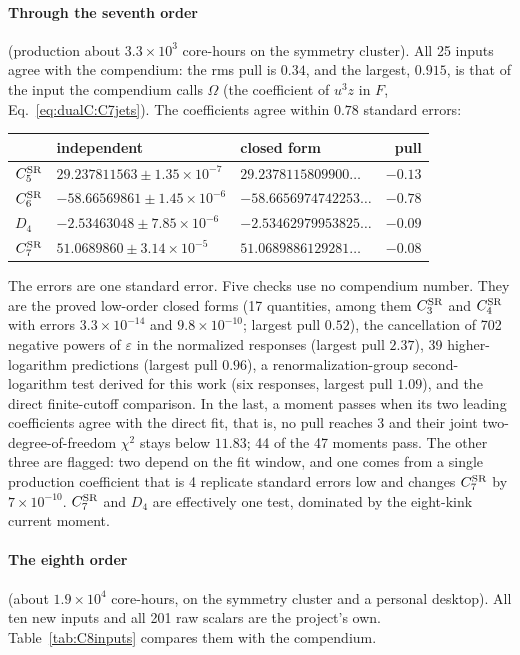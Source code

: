 \documentclass[11pt,a4paper]{article}
\numberwithin{equation}{section}
\newcommand{\CSR}{C^{\rm SR}}
\newcommand{\sci}[2]{#1\times10^{#2}}
\begin{document}
\paragraph{Through the seventh order} (production about $\sci{3.3}{3}$ core-hours on the symmetry cluster). All 25
inputs agree with the compendium: the rms pull is $0.34$, and the largest, $0.915$, is that of the input the compendium
calls $\Omega$ (the coefficient of $u^3z$ in $F$, Eq.~\eqref{eq:dualC:C7jets}). The coefficients agree within $0.78$ standard errors:
\begin{center}\small
\begin{tabular}{@{}lllr@{}}
\toprule
& independent & closed form & pull\\
\midrule
$\CSR_5$ & $29.237811563\pm\sci{1.35}{-7}$ & $29.2378115809900\ldots$ & $-0.13$\\
$\CSR_6$ & $-58.66569861\pm\sci{1.45}{-6}$ & $-58.6656974742253\ldots$ & $-0.78$\\
$D_4$ & $-2.53463048\pm\sci{7.85}{-6}$ & $-2.53462979953825\ldots$ & $-0.09$\\
$\CSR_7$ & $51.0689860\pm\sci{3.14}{-5}$ & $51.0689886129281\ldots$ & $-0.08$\\
\bottomrule
\end{tabular}
\end{center}
The errors are one standard error. Five checks use no compendium number. They are the proved low-order closed forms
(17 quantities, among them $\CSR_3$ and $\CSR_4$ with errors $\sci{3.3}{-14}$ and $\sci{9.8}{-10}$; largest pull
$0.52$), the cancellation of 702 negative powers of $\varepsilon$ in the normalized responses (largest pull $2.37$),
39 higher-logarithm predictions (largest pull $0.96$), a renormalization-group second-logarithm test derived for this
work (six responses, largest pull $1.09$), and the direct finite-cutoff comparison. In the last, a moment passes when
its two leading coefficients agree with the direct fit, that is, no pull reaches 3 and their joint
two-degree-of-freedom $\chi^2$ stays below $11.83$; 44 of the 47 moments pass. The other three are flagged: two depend
on the fit window, and one comes from a single production coefficient that is 4 replicate standard errors low and
changes $\CSR_7$ by $\sci{7}{-10}$. $\CSR_7$ and $D_4$ are effectively one test, dominated by the eight-kink current
moment.

\paragraph{The eighth order} (about $\sci{1.9}{4}$ core-hours, on the symmetry cluster and a personal desktop). All
ten new inputs and all 201 raw scalars are the project's own. Table~\ref{tab:C8inputs} compares them with the
compendium.
\end{document}
